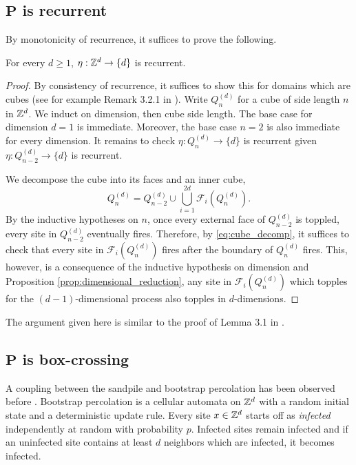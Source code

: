\documentclass[12pt]{amsart}
\begin{document}
\subsection{\texorpdfstring{$\mathbf{P}$}{P} is recurrent}
By monotonicity of recurrence, it suffices to prove the following. 
\begin{prop} \label{prop:recurrence}
	For every $d \geq 1$, $\eta:\mathbb{Z}^d \to \{d\}$ is recurrent.
\end{prop}
\begin{proof}
	By consistency of recurrence, it suffices to show this for domains which are cubes (see for example Remark 3.2.1 in \cite{redig2005mathematical}). Write $Q_n^{(d)}$ for a cube of side length $n$ in $\mathbb{Z}^d$.
	We induct on dimension, then cube side length. The base case for dimension $d = 1$ is immediate. 
	Moreover, the base case $n = 2$ is also immediate for every dimension.
	It remains to check $\eta: Q_n^{(d)} \to \{d\}$ is recurrent given $\eta: Q_{n-2}^{(d)} \to \{d\}$ is recurrent.
	
	We decompose the cube into its faces and an inner cube, 
	\begin{equation} \label{eq:cube_decomp}
	Q_{n}^{(d)} = Q_{n-2}^{(d)} \cup \bigcup_{i=1}^{2d} \mathcal{F}_i(Q_n^{(d)}).
	\end{equation}
	By the inductive hypotheses on $n$, once every external face of $Q_{n-2}^{(d)}$ is toppled, every site in $Q^{(d)}_{n-2}$ 
	eventually fires. Therefore, by \eqref{eq:cube_decomp}, it suffices to check that every site in  
	$\mathcal{F}_i(Q_n^{(d)})$ fires after the boundary of $Q_n^{(d)}$ fires.  This, however, is a consequence of the inductive hypothesis
	on dimension and Proposition \ref{prop:dimensional_reduction}, any site in $\mathcal{F}_i(Q_n^{(d)})$ which topples for the $(d-1)$-dimensional process also topples in $d$-dimensions.
	
\end{proof}
\begin{remark}
	The argument given here is similar to the proof of Lemma 3.1 in \cite{schonmann1992behavior}.
\end{remark}

\subsection{\texorpdfstring{$\mathbf{P}$}{P} is box-crossing}
A coupling between the sandpile and bootstrap percolation has been observed before  \cite{fey2010growth}. 
Bootstrap percolation is a cellular automata on $\mathbb{Z}^d$ with a random initial state and a deterministic update rule. 
Every site $x \in \mathbb{Z}^d$ starts off as {\it infected} independently at random with probability $p$. 
Infected sites remain infected and if an uninfected site contains at least $d$ neighbors which
are infected, it becomes infected.
\end{document}
